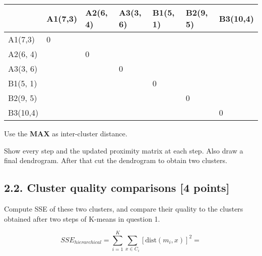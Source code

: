 \documentclass{article}
\begin{document}
\begin{table}[h]
\label{T21}
\begin{tabular}{|l|l|l|l|l|l|l|}
\hline
         & A1(7,3) & A2(6, 4) & A3(3, 6) & B1(5, 1) & B2(9, 5) & B3(10,4) \\ \hline
A1(7,3)  & 0       &          &          &          &          &          \\ \hline
A2(6, 4) &         & 0        &          &          &          &          \\ \hline
A3(3, 6) &         &          & 0        &          &          &          \\ \hline
B1(5, 1) &         &          &          & 0        &          &          \\ \hline
B2(9, 5) &         &          &          &          & 0        &          \\ \hline
B3(10,4) &         &          &          &          &          & 0        \\ \hline
\end{tabular}
\end{table}
\label{T2}

Use the \textbf{MAX} as inter-cluster distance.

Show every step and the updated proximity matrix at each step. Also draw a final dendrogram.
After that cut the dendrogram to obtain two clusters.









\subsection*{2.2. Cluster quality comparisons [4 points]}

Compute SSE of these two clusters, and compare their quality to the clusters obtained after two steps of K-means in question 1.

\[
SSE_{hierarchical} = \sum_{i=1}^{K} \sum_{x \in C_i} \left[ \text{dist}(m_i, x) \right]^2=
\]
\end{document}
